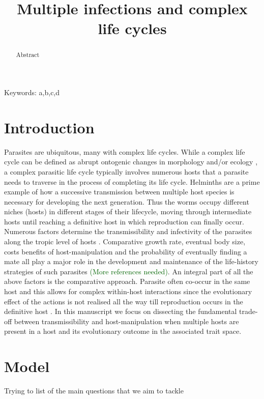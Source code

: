\documentclass{article}
\title{\vspace*{-22mm}\bf Multiple infections and complex life cycles}
\date{}
\newcommand{\cha}[1]{\textcolor{darkgreen}{(#1)}}
\begin{document}
\linenumbers
\maketitle


\begin{abstract}
Abstract
\end{abstract}


\noindent
Keywords: a,b,c,d


\tableofcontents

\section{Introduction}

Parasites are ubiquitous, many with complex life cycles.
While a complex life cycle can be defined as abrupt ontogenic changes in morphology and/or ecology \cite{Benesh:2016dj}, a complex parasitic life cycle typically involves numerous hosts that a parasite needs to traverse in the process of completing its life cycle.
Helminths are a prime example of how a successive transmission between multiple host species is necessary for developing the next generation.
Thus the worms occupy different niches (hosts) in different stages of their lifecycle, moving through intermediate hosts until reaching a definitive host in which reproduction can finally occur.
Numerous factors determine the transmissibility and infectivity of the parasites along the tropic level of hosts \cite{froelick:PRSB:2021}.
Comparative growth rate, eventual body size, costs benefits of host-manipulation and the probability of eventually finding a mate all play a major role in the development and maintenance of the life-history strategies of such parasites \cha{More references needed}.
An integral part of all the above factors is the comparative approach.
Parasite often co-occur in the same host and this allows for complex within-host interactions since the evolutionary effect of the actions is not realised all the way till reproduction occurs in the definitive host \cite{Hafer:2015gl}.
In this manuscript we focus on dissecting the fundamental trade-off between transmissibility and host-manipulation when multiple hosts are present in a host and its evolutionary outcome in the associated trait space.


\section{Model}

Trying to list of the main questions that we aim to tackle
\end{document}
